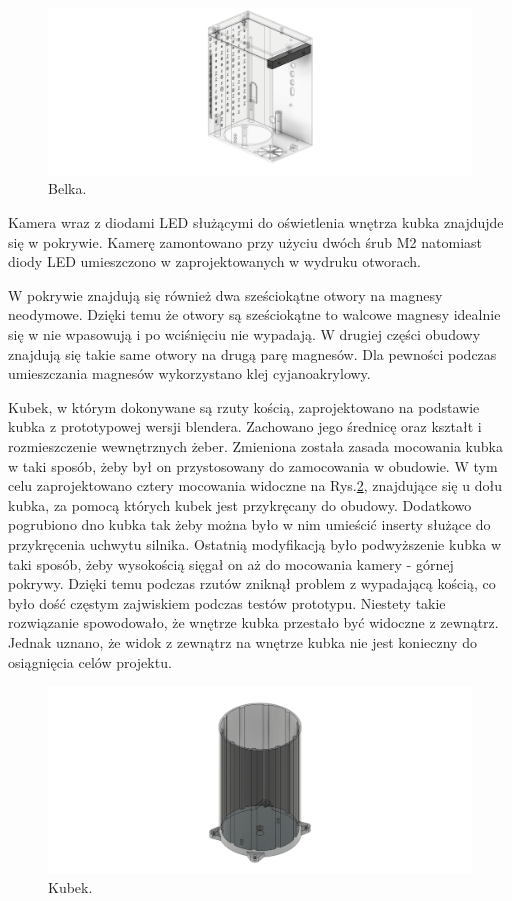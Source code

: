 \begin{figure}[H]
    \centering
    \includegraphics[width=0.95\linewidth]{chapters/03-praca-wlasna/figures/belka.png}
    \caption{\label{fig:belka}Belka.}
\end{figure}

Kamera wraz z diodami LED służącymi do oświetlenia wnętrza kubka znajdujde się w pokrywie. Kamerę zamontowano przy użyciu dwóch śrub M2 natomiast
diody LED umieszczono w zaprojektowanych w wydruku otworach.

W pokrywie znajdują się również dwa sześciokątne otwory na magnesy neodymowe. Dzięki temu że otwory są sześciokątne to walcowe magnesy idealnie
się w nie wpasowują i po wciśnięciu nie wypadają. W drugiej części obudowy znajdują się takie same otwory na drugą parę magnesów. Dla pewności podczas umieszczania magnesów 
wykorzystano klej cyjanoakrylowy.

Kubek, w którym dokonywane są rzuty kością, zaprojektowano na podstawie kubka z prototypowej wersji blendera. Zachowano jego średnicę oraz kształt i rozmieszczenie wewnętrznych
żeber. Zmieniona została zasada mocowania kubka w taki sposób, żeby był on przystosowany do zamocowania w obudowie. W tym celu zaprojektowano
cztery mocowania widoczne na Rys.\ref{fig:kubek}, znajdujące się u dołu kubka, za pomocą których kubek jest przykręcany do obudowy. Dodatkowo pogrubiono dno kubka tak żeby można było w nim umieścić inserty służące 
do przykręcenia uchwytu silnika. Ostatnią modyfikacją było podwyższenie kubka w taki sposób, żeby wysokością sięgał on aż do mocowania kamery - górnej pokrywy.
Dzięki temu podczas rzutów zniknął problem z wypadającą kością, co było dość częstym zajwiskiem podczas testów prototypu. Niestety takie rozwiązanie
spowodowało, że wnętrze kubka przestało być widoczne z zewnątrz. Jednak uznano, że widok z zewnątrz na wnętrze kubka nie jest konieczny do osiągnięcia celów projektu.

\begin{figure}[H]
    \centering
    \includegraphics[width=0.95\linewidth]{chapters/03-praca-wlasna/figures/kubek.png}
    \caption{\label{fig:kubek}Kubek.}
\end{figure}

